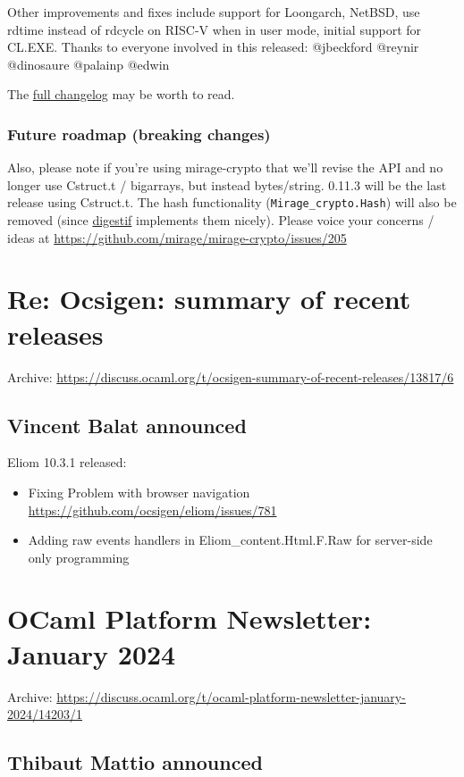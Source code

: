 \documentclass[11pt]{article}
\begin{document}
Other improvements and fixes include support for Loongarch, NetBSD, use rdtime instead of rdcycle on RISC-V when in user mode,
initial support for CL.EXE. Thanks to everyone involved in this released: @jbeckford @reynir @dinosaure @palainp @edwin

The \href{https://github.com/mirage/mirage-crypto/releases/tag/v0.11.3}{full changelog} may be worth to read.
\subsubsection*{Future roadmap (breaking changes)}
\label{sec:org4a25ec4}

Also, please note if you're using mirage-crypto that we'll revise the API and no longer use Cstruct.t / bigarrays, but instead
bytes/string. 0.11.3 will be the last release using Cstruct.t. The hash functionality (\texttt{Mirage\_crypto.Hash}) will also be removed
(since \href{https://github.com/mirage/digestif}{digestif} implements them nicely). Please voice your concerns / ideas at
\url{https://github.com/mirage/mirage-crypto/issues/205}
\section*{Re: Ocsigen: summary of recent releases}
\label{2}
Archive: \url{https://discuss.ocaml.org/t/ocsigen-summary-of-recent-releases/13817/6}
\subsection*{Vincent Balat announced}
\label{sec:orgf73d38b}


Eliom 10.3.1 released:
\begin{itemize}
\item Fixing Problem with browser navigation \url{https://github.com/ocsigen/eliom/issues/781}
\item Adding raw events handlers in Eliom\_content.Html.F.Raw for server-side only programming
\end{itemize}
\section*{OCaml Platform Newsletter: January 2024}
\label{3}
Archive: \url{https://discuss.ocaml.org/t/ocaml-platform-newsletter-january-2024/14203/1}
\subsection*{Thibaut Mattio announced}
\label{sec:orgdbf7237}
\end{document}
